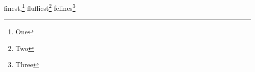 \documentclass{article}
\begin{document}
finest,\footnote{One} fluffiest\footnote{Two} felines\footnote{Three}
\end{document}
